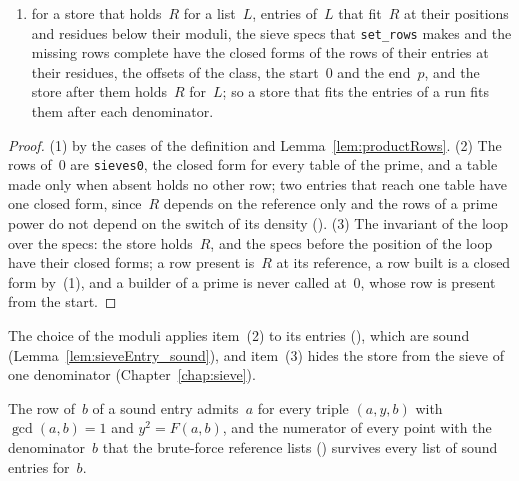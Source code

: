 \begin{lemma}
\begin{enumerate}
      references for them; and an entry of a modulus as the choice makes it
      (Chapter~\ref{chap:moduli}) fits the rows of the references of the run at its position;
    \item for a store that holds~$R$ for a list~$L$, entries of~$L$ that fit~$R$ at their positions
      and residues below their moduli, the sieve specs that \verb|set_rows| makes and the missing
      rows complete have the closed forms of the rows of their entries at their residues, the
      offsets of the class, the start~$0$ and the end~$p$, and the store after them holds~$R$
      for~$L$; so a store that fits the entries of a run fits them after each denominator.
  \end{enumerate}
\end{lemma}

\begin{proof}
  \leanok
  (1) by the cases of the definition and Lemma~\ref{lem:productRows}. (2) The rows of~$0$ are
  \verb|sieves0|, the closed form for every table of the prime, and a table made only when absent
  holds no other row; two entries that reach one table have one closed form, since~$R$ depends on
  the reference only and the rows of a prime power do not depend on the switch of its density
  (). (3) The invariant of the loop over the
  specs: the store holds~$R$, and the specs before the position of the loop have their closed
  forms; a row present is~$R$ at its reference, a row built is a closed form by~(1), and a builder
  of a prime is never called at~$0$, whose row is present from the start.
\end{proof}

The choice of the moduli applies item~(2) to its entries
(), which are sound
(Lemma~\ref{lem:sieveEntry_sound}), and item~(3) hides the store from the sieve of one denominator
(Chapter~\ref{chap:sieve}).

\begin{lemma}\label{lem:rowsAdmitPoints}
  \leanok
  The row of~$b$ of a sound entry admits~$a$ for every triple $(a, y, b)$ with $\gcd(a, b) = 1$
  and $y^2 = F(a, b)$, and the numerator of every point with the denominator~$b$ that the
  brute-force reference lists () survives every list of
  sound entries for~$b$.
\end{lemma}

